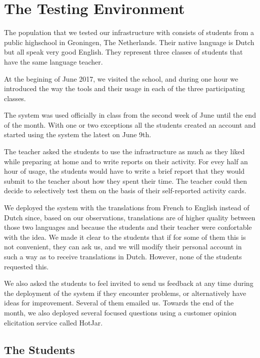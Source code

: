
\newpage
\section{The Testing Environment}

The population that we tested our infrastructure with consists of \stcnt  students from a public highschool in Groningen, The Netherlands. Their native language is Dutch but all speak very good English. They represent three classes of students that have the same language teacher.

At the begining of June 2017, we visited the school, and during one hour we introduced the way the tools and their usage in each of the three participating classes.

The system was used officially in class from the second week of June until the end of the month. With one or two exceptions all the students created an account and started using the system the latest on June 9th. 

The teacher asked the students to use the infrastructure as much as they liked while preparing at home and to write reports on their activity. For evey half an hour of usage, the students would have to write a brief report that they would submit to the teacher about how they spent their time. The teacher could then decide to selectively test them on the basis of their self-reported activity cards.

We deployed the system with the translations from French to English instead of Dutch since, based on our observations, translations are of higher quality between those two languages and because the students and their teacher were confortable with the idea. We made it clear to the students that if for some of them this is not convenient, they can ask us, and we will modify their personal account in such a way as to receive translations in Dutch. However, none of the students requested this.

We also asked the students to feel invited to send us feedback at any time during the deployment of the system if they encounter problems, or alternatively have ideas for improvement. Several of them emailed us. Towards the end of the month, we also deployed several focused questions using a customer opinion elicitation service called HotJar. 

\subsection{The Students}

